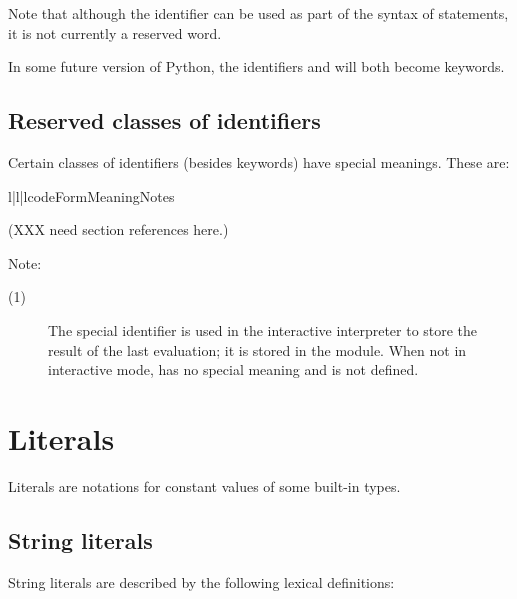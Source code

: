 
Note that although the identifier  can be used as part of the
syntax of  statements, it is not currently a reserved
word.

In some future version of Python, the identifiers  and
 will both become keywords.


\subsection{Reserved classes of identifiers\label{id-classes}}

Certain classes of identifiers (besides keywords) have special
meanings.  These are:

\begin{tableiii}{l|l|l}{code}{Form}{Meaning}{Notes}
\end{tableiii}

(XXX need section references here.)

Note:

\begin{description}
\item[(1)] The special identifier \samp{_} is used in the interactive
interpreter to store the result of the last evaluation; it is stored
in the  module.  When not in interactive mode,
\samp{_} has no special meaning and is not defined.
\end{description}


\section{Literals\label{literals}}

Literals are notations for constant values of some built-in types.


\subsection{String literals\label{strings}}

String literals are described by the following lexical definitions:

